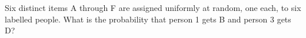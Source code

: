 Six distinct items A through F are assigned uniformly at random, one each, to six labelled people. What is the probability that person 1 gets B and person 3 gets D?
